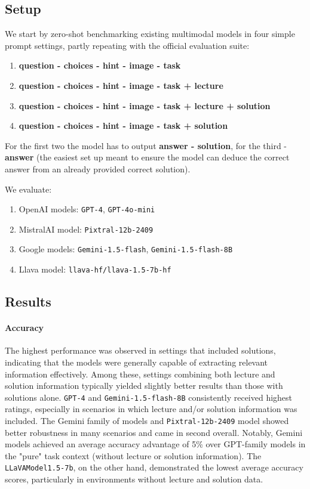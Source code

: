 \documentclass{article}
\begin{document}
\subsection{Setup}
We start by zero-shot benchmarking existing multimodal models in four simple prompt settings, partly repeating with the official evaluation suite:
\begin{enumerate}
	\item \textbf{question - choices - hint - image - task}
	\item \textbf{question - choices - hint - image - task + lecture}
	\item \textbf{question - choices - hint - image - task + lecture + solution}
	\item \textbf{question - choices - hint - image - task + solution}
\end{enumerate}

For the first two the model has to output \textbf{answer - solution}, for the third - \textbf{answer} (the easiest set up meant to ensure the model can deduce the correct answer from an already provided correct solution). 

We evaluate: 
\begin{enumerate}
	\item OpenAI models: \texttt{GPT-4}, \texttt{GPT-4o-mini}
	\item MistralAI model: \texttt{Pixtral-12b-2409}
    \item Google models: \texttt{Gemini-1.5-flash}, \texttt{Gemini-1.5-flash-8B}
	\item Llava model:  \texttt{llava-hf/llava-1.5-7b-hf}
\end{enumerate}


\subsection{Results}
\paragraph{Accuracy}
The highest performance was observed in settings that included solutions, indicating that the models were generally capable of extracting relevant information effectively. Among these, settings combining both lecture and solution information typically yielded slightly better results than those with solutions alone. \texttt{GPT-4} and \texttt{Gemini-1.5-flash-8B} consistently received highest ratings, especially in scenarios in which lecture and/or solution information was included. The Gemini family of models and  \texttt{Pixtral-12b-2409} model showed better robustness in many scenarios and came in second overall. Notably, Gemini models achieved an average accuracy advantage of 5\% over GPT-family models in the "pure" task context (without lecture or solution information). The \texttt{LLaVAModel1.5-7b}, on the other hand, demonstrated the lowest average accuracy scores, particularly in environments without lecture and solution data.
\end{document}
